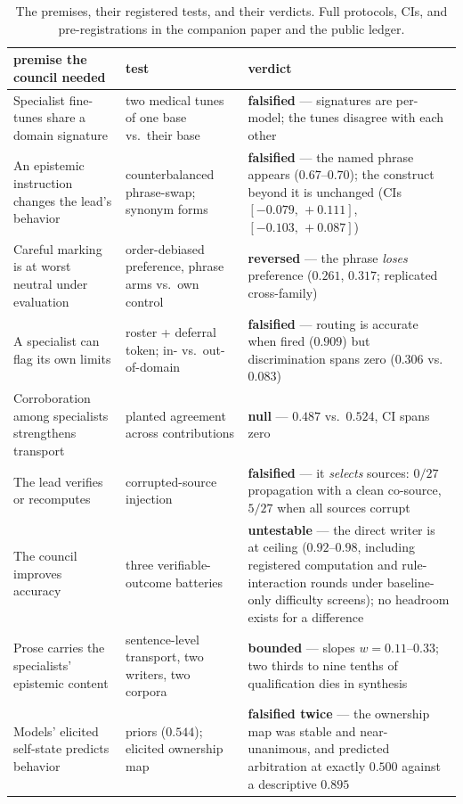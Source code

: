 \documentclass[11pt]{article}
\newcommand{\ci}[2]{\ensuremath{[#1,\,#2]}}
\begin{document}
\begin{table}[t]
\centering\small
\begin{tabular}{p{}p{}p{}}
\toprule
premise the council needed & test & verdict \\
\midrule
Specialist fine-tunes share a domain signature & two medical tunes of
one base vs.\ their base & \textbf{falsified} --- signatures are
per-model; the tunes disagree with each other \\
An epistemic instruction changes the lead's behavior & counterbalanced
phrase-swap; synonym forms & \textbf{falsified} --- the named phrase
appears ($0.67$--$0.70$); the construct beyond it is unchanged
(CIs \ci{-0.079}{+0.111}, \ci{-0.103}{+0.087}) \\
Careful marking is at worst neutral under evaluation & order-debiased
preference, phrase arms vs.\ own control & \textbf{reversed} --- the
phrase \emph{loses} preference ($0.261$, $0.317$; replicated
cross-family) \\
A specialist can flag its own limits & roster + deferral token;
in- vs.\ out-of-domain & \textbf{falsified} --- routing is accurate
when fired ($0.909$) but discrimination spans zero ($0.306$ vs.\
$0.083$) \\
Corroboration among specialists strengthens transport & planted
agreement across contributions & \textbf{null} --- $0.487$ vs.\
$0.524$, CI spans zero \\
The lead verifies or recomputes & corrupted-source injection &
\textbf{falsified} --- it \emph{selects} sources: $0/27$ propagation
with a clean co-source, $5/27$ when all sources corrupt \\
The council improves accuracy & three verifiable-outcome batteries &
\textbf{untestable} --- the direct writer is at ceiling ($0.92$--$0.98$,
including registered computation and rule-interaction rounds under
baseline-only difficulty screens); no headroom exists for a difference \\
Prose carries the specialists' epistemic content & sentence-level
transport, two writers, two corpora & \textbf{bounded} --- slopes
$w=0.11$--$0.33$; two thirds to nine tenths of qualification dies in
synthesis \\
Models' elicited self-state predicts behavior & priors ($0.544$);
elicited ownership map & \textbf{falsified twice} --- the ownership map
was stable and near-unanimous, and predicted arbitration at exactly
$0.500$ against a descriptive $0.895$ \\
\bottomrule
\end{tabular}
\caption{The premises, their registered tests, and their verdicts. Full
protocols, CIs, and pre-registrations in the companion paper and the
public ledger.}
\label{tab:premises}
\end{table}
\end{document}

